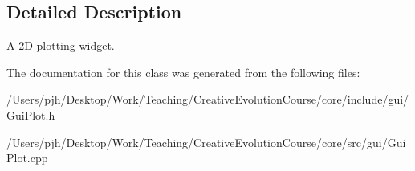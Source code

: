 \subsection{Detailed Description}
A 2\-D plotting widget. 

The documentation for this class was generated from the following files\-:\begin{DoxyCompactItemize}
\item 
/\-Users/pjh/\-Desktop/\-Work/\-Teaching/\-Creative\-Evolution\-Course/core/include/gui/Gui\-Plot.\-h\item 
/\-Users/pjh/\-Desktop/\-Work/\-Teaching/\-Creative\-Evolution\-Course/core/src/gui/Gui\-Plot.\-cpp\end{DoxyCompactItemize}
